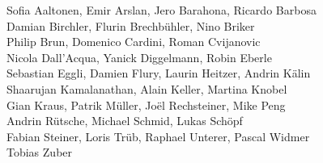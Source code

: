 %
%
%
Sofia Aaltonen,		%
Emir Arslan, 		%
Jero Barahona,		%
Ricardo Barbosa%
\\
Damian Birchler,	%
Flurin Brechbühler,	%
Nino Briker%
\\
Philip Brun,		%
Domenico Cardini,	%
Roman Cvijanovic%
\\
Nicola Dall'Acqua,	%
Yanick Diggelmann,	%
Robin Eberle%
\\
Sebastian Eggli,	%
Damien Flury,		%
Laurin Heitzer,		%
Andrin Kälin%
\\
Shaarujan Kamalanathan,	%
Alain Keller,		%
Martina Knobel%
\\
Gian Kraus,		%
Patrik Müller,		%
Joël Rechsteiner,	%
Mike Peng%
\\
Andrin Rütsche,		%
Michael Schmid,		%
Lukas Schöpf%
\\
Fabian Steiner,		%
Loris Trüb,		%
Raphael Unterer,	%
Pascal Widmer%
\\
Tobias Zuber%
\\
